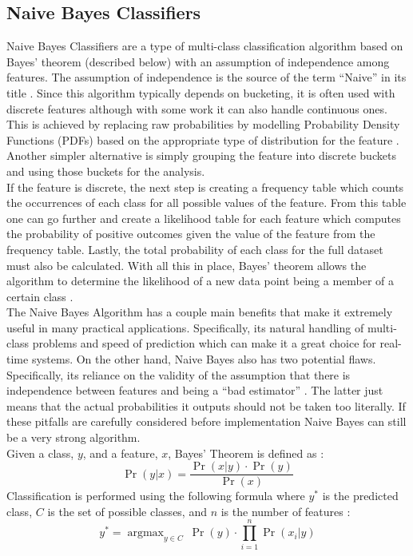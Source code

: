 \documentclass[titlepage]{article}
\DeclareMathOperator*{\argmax}{argmax}
\begin{document}
\subsection{Naive Bayes Classifiers}
Naive Bayes Classifiers are a type of multi-class classification algorithm based on Bayes' theorem (described below) with an assumption of independence among features. The assumption of independence is the source of the term ``Naive'' in its title \cite{NaiveBayesOG}. Since this algorithm typically depends on bucketing, it is often used with discrete features although with some work it can also handle continuous ones. This is achieved by replacing raw probabilities by modelling Probability Density Functions (PDFs) based on the appropriate type of distribution for the feature \cite{NaiveBayesOG}. Another simpler alternative is simply grouping the feature into discrete buckets and using those buckets for the analysis.\\
If the feature is discrete, the next step is creating a frequency table which counts the occurrences of each class for all possible values of the feature. From this table one can go further and create a likelihood table for each feature which computes the probability of positive outcomes given the value of the feature from the frequency table. Lastly, the total probability of each class for the full dataset must also be calculated. With all this in place, Bayes' theorem allows the algorithm to determine the likelihood of a new data point being a member of a certain class \cite{NaiveBayesOG}.\\
The Naive Bayes Algorithm has a couple main benefits that make it extremely useful in many practical applications. Specifically, its natural handling of multi-class problems and speed of prediction which can make it a great choice for real-time systems. On the other hand, Naive Bayes also has two potential flaws. Specifically, its reliance on the validity of the assumption that there is independence between features and being a ``bad estimator'' \cite{NaiveBayesEstimator}. The latter just means that the actual probabilities it outputs should not be taken too literally. If these pitfalls are carefully considered before implementation Naive Bayes can still be a very strong algorithm.\\
Given a class, $y$, and a feature, $x$, Bayes' Theorem is defined as \cite{NaiveBayesOG}:
$$\Pr(y \vert x) = \frac{\Pr(x \vert y) \cdot \Pr(y)}{\Pr(x)}$$
Classification is performed using the following formula where $y^*$ is the predicted class, $C$ is the set of possible classes, and $n$ is the number of features \cite{NaiveBayesOG}:
$$y^* = \argmax_{y \in C}~\Pr(y) \cdot \prod\limits_{i=1}^n \Pr(x_i \vert y)$$
\end{document}
